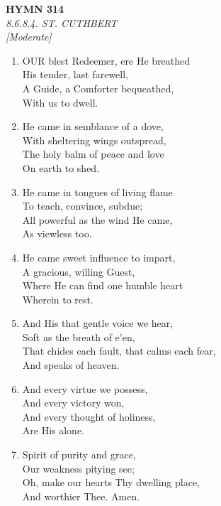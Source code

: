 \documentclass[11pt,a4paper]{article}
\begin{document}
\newpage
\begin{center}
    {\Large \textbf{HYMN 314}}
    \\
    \textit{8.6.8.4. ST. CUTHBERT}
    \\
    \textit{\small [Moderate]}
\end{center}
\vspace{1em}

\begin{enumerate}
    \item OUR blest Redeemer, ere He breathed \\
        His tender, last farewell, \\
        A Guide, a Comforter bequeathed, \\
        With us to dwell.

    \item He came in semblance of a dove, \\
        With sheltering wings outspread, \\
        The holy balm of peace and love \\
        On earth to shed.

    \item He came in tongues of living flame \\
        To teach, convince, subdue; \\
        All powerful as the wind He came, \\
        As viewless too.

    \item He came sweet influence to impart, \\
        A gracious, willing Guest, \\
        Where He can find one humble heart \\
        Wherein to rest.

    \item And His that gentle voice we hear, \\
        Soft as the breath of e'en, \\
        That chides each fault, that calms each fear, \\
        And speaks of heaven.

    \item And every virtue we possess, \\
        And every victory won, \\
        And every thought of holiness, \\
        Are His alone.

    \item Spirit of purity and grace, \\
        Our weakness pitying see; \\
        Oh, make our hearts Thy dwelling place, \\
        And worthier Thee. Amen.

\end{enumerate}
\end{document}
